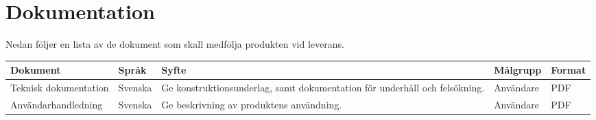 \documentclass[kravspec/krav.tex]{subfiles}
\begin{document}
\section{Dokumentation}
\label{sec:doc}
Nedan följer en lista av de dokument som skall medfölja produkten vid leverans.
\begin{longtable}{p{4.5cm}p{1.5cm}p{5cm}p{2cm}p{1.2cm}}
    \bfseries Dokument &
    \bfseries Språk &
    \bfseries Syfte &
    \bfseries Målgrupp &
    \bfseries Format \\\hline
    Teknisk dokumentation & Svenska & Ge konstruktionsunderlag, samt dokumentation för
    underhåll och felsökning. & Användare & PDF \\
    Användarhandledning & Svenska & Ge beskrivning av produktens användning. & Användare & PDF
    \endhead
\end{longtable}
\end{document}
